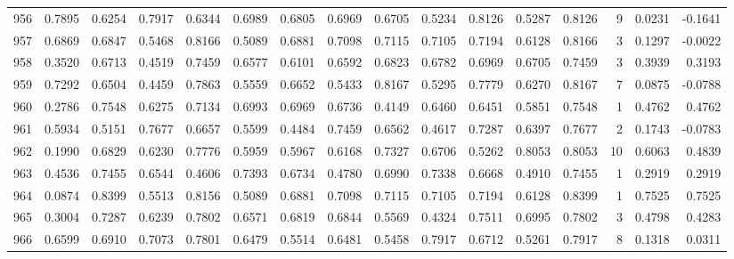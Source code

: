 \begin{tabular}{lrrrrrrrrrrrrrrr}
956 &      0.7895 &  0.6254 &  0.7917 &  0.6344 &  0.6989 &  0.6805 &  0.6969 &  0.6705 &  0.5234 &  0.8126 &   0.5287 &     0.8126 &      9 &                    0.0231 &                    -0.1641 \\
957 &      0.6869 &  0.6847 &  0.5468 &  0.8166 &  0.5089 &  0.6881 &  0.7098 &  0.7115 &  0.7105 &  0.7194 &   0.6128 &     0.8166 &      3 &                    0.1297 &                    -0.0022 \\
958 &      0.3520 &  0.6713 &  0.4519 &  0.7459 &  0.6577 &  0.6101 &  0.6592 &  0.6823 &  0.6782 &  0.6969 &   0.6705 &     0.7459 &      3 &                    0.3939 &                     0.3193 \\
959 &      0.7292 &  0.6504 &  0.4459 &  0.7863 &  0.5559 &  0.6652 &  0.5433 &  0.8167 &  0.5295 &  0.7779 &   0.6270 &     0.8167 &      7 &                    0.0875 &                    -0.0788 \\
960 &      0.2786 &  0.7548 &  0.6275 &  0.7134 &  0.6993 &  0.6969 &  0.6736 &  0.4149 &  0.6460 &  0.6451 &   0.5851 &     0.7548 &      1 &                    0.4762 &                     0.4762 \\
961 &      0.5934 &  0.5151 &  0.7677 &  0.6657 &  0.5599 &  0.4484 &  0.7459 &  0.6562 &  0.4617 &  0.7287 &   0.6397 &     0.7677 &      2 &                    0.1743 &                    -0.0783 \\
962 &      0.1990 &  0.6829 &  0.6230 &  0.7776 &  0.5959 &  0.5967 &  0.6168 &  0.7327 &  0.6706 &  0.5262 &   0.8053 &     0.8053 &     10 &                    0.6063 &                     0.4839 \\
963 &      0.4536 &  0.7455 &  0.6544 &  0.4606 &  0.7393 &  0.6734 &  0.4780 &  0.6990 &  0.7338 &  0.6668 &   0.4910 &     0.7455 &      1 &                    0.2919 &                     0.2919 \\
964 &      0.0874 &  0.8399 &  0.5513 &  0.8156 &  0.5089 &  0.6881 &  0.7098 &  0.7115 &  0.7105 &  0.7194 &   0.6128 &     0.8399 &      1 &                    0.7525 &                     0.7525 \\
965 &      0.3004 &  0.7287 &  0.6239 &  0.7802 &  0.6571 &  0.6819 &  0.6844 &  0.5569 &  0.4324 &  0.7511 &   0.6995 &     0.7802 &      3 &                    0.4798 &                     0.4283 \\
966 &      0.6599 &  0.6910 &  0.7073 &  0.7801 &  0.6479 &  0.5514 &  0.6481 &  0.5458 &  0.7917 &  0.6712 &   0.5261 &     0.7917 &      8 &                    0.1318 &                     0.0311 \\

\end{tabular}
